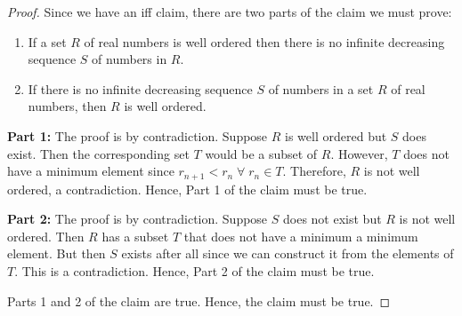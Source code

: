 \documentclass{article}
\begin{document}
\begin{proof}
	Since we have an iff claim, there are two parts of the claim we must prove:
	\begin{enumerate}
		\item If a set $R$ of real numbers is well ordered then there is no infinite decreasing sequence $S$ of numbers in $R$.
		\item If there is no infinite decreasing sequence $S$ of numbers in a set $R$ of real numbers, then $R$ is well ordered.
	\end{enumerate}

	\textbf{Part 1:}
	The proof is by contradiction. Suppose $R$ is well ordered but $S$ does exist. Then the corresponding set $T$ would be a subset of $R$. However, $T$ does not have a minimum element since $r_{n+1} < r_n \; \forall \; r_n \in T$.  Therefore, $R$ is not well ordered, a contradiction. Hence, Part 1 of the claim must be true.

	\textbf{Part 2:}
	The proof is by contradiction. Suppose $S$ does not exist but $R$ is not well ordered. Then $R$ has a subset $T$ that does not have a minimum a minimum element. But then $S$ exists after all since we can construct it from the elements of $T$. This is a contradiction. Hence, Part 2 of the claim must be true.

	Parts 1 and 2 of the claim are true. Hence, the claim must be true.
\end{proof}
\end{document}
